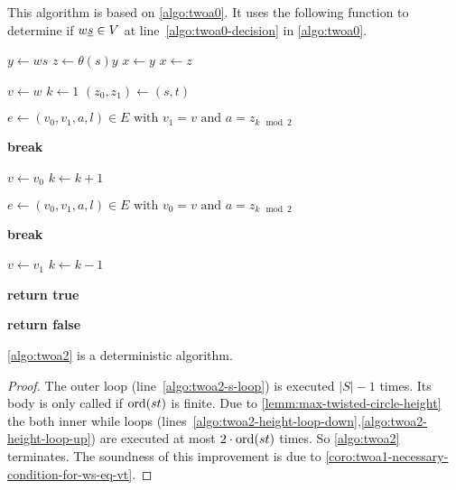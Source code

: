 \begin{algo}[TWOA2]
	This algorithm is based on \ref{algo:twoa0}. It uses the following function to determine if $w \underline{s} \in V$ at line~\ref{algo:twoa0-decision} in \ref{algo:twoa0}.

	\begin{algorithmic}[1]
		\State $y \gets ws$
		\State $z \gets \theta(s)y$
		 
			\State $x \gets y$
		\Else
			\State $x \gets z$
		\EndIf

		 \label{algo:twoa2-s-loop}
				\State $v \gets w$
				\State $k \gets 1$
				\State $(z_0,z_1) \gets (s,t)$

				 \label{algo:twoa2-height-loop-down} 
					\State $e \gets (v_0,v_1,a,l) \in E \textrm{ with } v_1 = v \textrm{ and } a = z_{k \mod 2}$

						\State \textbf{break}
					\EndIf

					\State $v \gets v_0$
					\State $k \gets k + 1$
				\EndWhile

				 \label{algo:twoa2-height-loop-up} 
					\State $e \gets (v_0,v_1,a,l) \in E \textrm{ with } v_0 = v \textrm{ and } a = z_{k \mod 2}$

						\State \textbf{break}
					\EndIf

					\State $v \gets v_1$
					\State $k \gets k - 1$
				\EndWhile

				 
					 
						\State \textbf{return true}
					\EndIf
				\EndIf
			\EndIf
		\EndFor

		\State \textbf{return false}
	\EndProcedure
	\end{algorithmic}
\end{algo}

\begin{lemm}
	\ref{algo:twoa2} is a deterministic algorithm.

	\begin{proof}
		The outer loop (line~\ref{algo:twoa2-s-loop}) is executed $|S|-1$ times. Its body is only called if $\operatorname{ord}(st)$ is finite. Due to \ref{lemm:max-twisted-circle-height} the both inner while loops (lines~\ref{algo:twoa2-height-loop-down},\ref{algo:twoa2-height-loop-up}) are executed at most $2 \cdot \operatorname{ord}(st)$ times. So \ref{algo:twoa2} terminates. The soundness of this improvement is due to \ref{coro:twoa1-necessary-condition-for-ws-eq-vt}.
	\end{proof}
\end{lemm}

